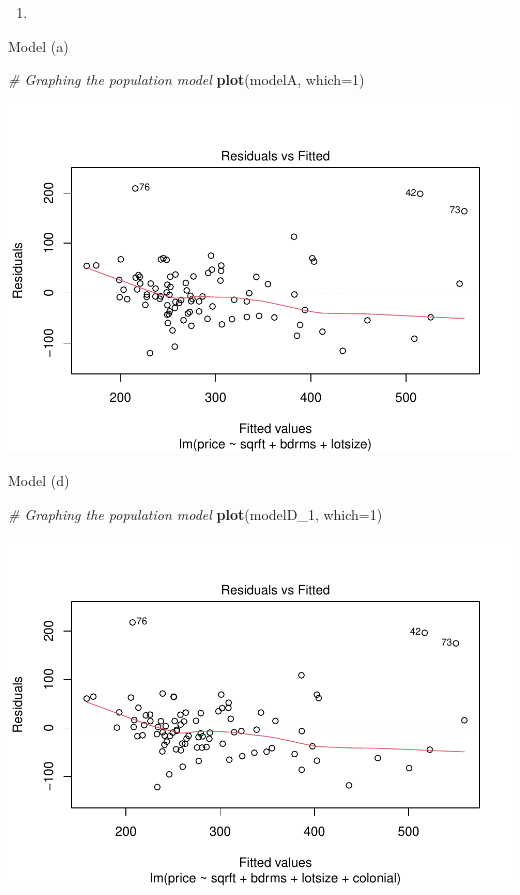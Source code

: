 \documentclass[
  12pt,
  landscape]{article}
\newenvironment{Shaded}{\begin{snugshade}}{\end{snugshade}}
\newcommand{\CommentTok}[1]{\textcolor[rgb]{0.56,0.35,0.01}{\textit{#1}}}
\newcommand{\DataTypeTok}[1]{\textcolor[rgb]{0.13,0.29,0.53}{#1}}
\newcommand{\DecValTok}[1]{\textcolor[rgb]{0.00,0.00,0.81}{#1}}
\newcommand{\KeywordTok}[1]{\textcolor[rgb]{0.13,0.29,0.53}{\textbf{#1}}}
\newcommand{\NormalTok}[1]{#1}
\begin{document}
\begin{enumerate}
\def\labelenumi{(\alph{enumi})}
\setcounter{enumi}{6}
\item
\end{enumerate}

Model (a)

\begin{Shaded}
\begin{Highlighting}[]
\CommentTok{# Graphing the population model }
\KeywordTok{plot}\NormalTok{(modelA, }\DataTypeTok{which=}\DecValTok{1}\NormalTok{)}
\end{Highlighting}
\end{Shaded}

\includegraphics{Ogle_MicroMetricsAssignment_2_Q1_files/figure-latex/unnamed-chunk-15-1.pdf}

Model (d)

\begin{Shaded}
\begin{Highlighting}[]
\CommentTok{# Graphing the population model }
\KeywordTok{plot}\NormalTok{(modelD_}\DecValTok{1}\NormalTok{, }\DataTypeTok{which=}\DecValTok{1}\NormalTok{)}
\end{Highlighting}
\end{Shaded}

\includegraphics{Ogle_MicroMetricsAssignment_2_Q1_files/figure-latex/unnamed-chunk-16-1.pdf}
\end{document}
